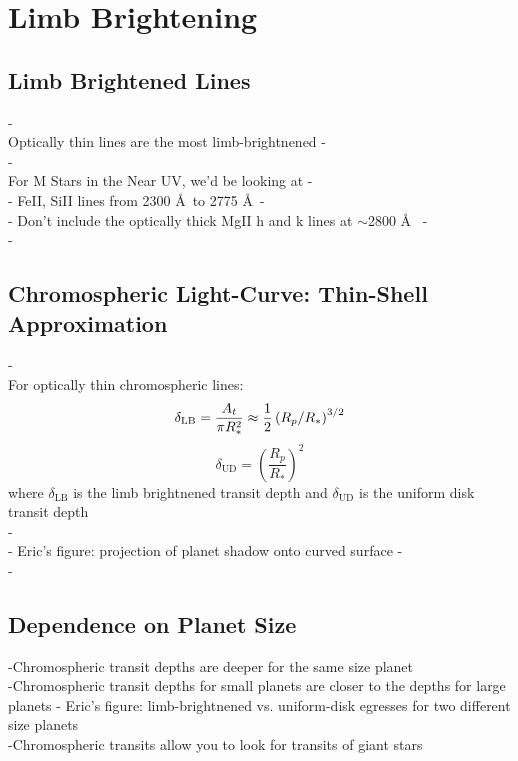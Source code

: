 \documentclass[manuscript]{aastex}
\begin{document}
\section{Limb Brightening}
\label{labl:limbbright}
\subsection{Limb Brightened Lines}
-\\
Optically thin lines are the most limb-brightnened
-\\
-\\
For M Stars in the Near UV, we'd be looking at 
-\\
- FeII, SiII lines from 2300 \AA\  to 2775 \AA\ 
-\\
- Don't include the optically thick MgII h and k lines at
$\sim$2800 \AA\ \citep{2007PASP..119...67H}
-\\
-\\

\subsection{Chromospheric Light-Curve: Thin-Shell Approximation}
\label{labl:chromlcurve}

-\\
For optically thin chromospheric lines:
\begin{equation}
\delta_{\mathrm{LB}} = {A_t \over \pi R_*^2} \approx \frac{1}{2}\left( R_p/R_* \right)^{3/2}
\end{equation}
\begin{equation}
\delta_{\mathrm{UD}} = \left( \frac{R_p}{R_*} \right)^2
\end{equation}
where $\delta_{\mathrm{LB}}$ is the limb brightnened transit depth and
$\delta_{\mathrm{UD}}$ is the uniform disk transit depth \\
 -\\
 - Eric's figure: projection of planet shadow onto curved surface
 -\\ - \\

\subsection{Dependence on Planet Size}
-Chromospheric transit depths are deeper for the same size planet \\
-Chromospheric transit  depths for small planets are closer to the depths for large planets
 - Eric's figure: limb-brightnened vs. uniform-disk egresses for two different size planets \\
-Chromospheric transits allow you to look for transits of giant stars \\
\end{document}
